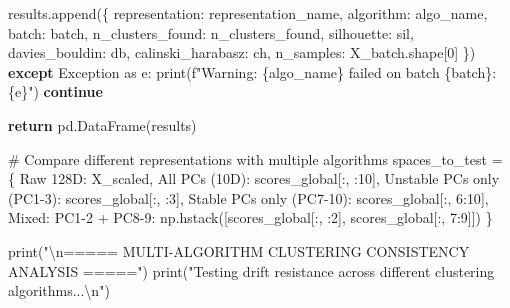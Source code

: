 \documentclass[
  letterpaper,
  DIV=11,
  numbers=noendperiod]{scrartcl}
\newenvironment{Shaded}{\begin{snugshade}}{\end{snugshade}}
\newcommand{\BuiltInTok}[1]{\textcolor[rgb]{0.00,0.23,0.31}{#1}}
\newcommand{\CharTok}[1]{\textcolor[rgb]{0.13,0.47,0.30}{#1}}
\newcommand{\CommentTok}[1]{\textcolor[rgb]{0.37,0.37,0.37}{#1}}
\newcommand{\ControlFlowTok}[1]{\textcolor[rgb]{0.00,0.23,0.31}{\textbf{#1}}}
\newcommand{\DecValTok}[1]{\textcolor[rgb]{0.68,0.00,0.00}{#1}}
\newcommand{\ImportTok}[1]{\textcolor[rgb]{0.00,0.46,0.62}{#1}}
\newcommand{\NormalTok}[1]{\textcolor[rgb]{0.00,0.23,0.31}{#1}}
\newcommand{\OperatorTok}[1]{\textcolor[rgb]{0.37,0.37,0.37}{#1}}
\newcommand{\PreprocessorTok}[1]{\textcolor[rgb]{0.68,0.00,0.00}{#1}}
\newcommand{\SpecialCharTok}[1]{\textcolor[rgb]{0.37,0.37,0.37}{#1}}
\newcommand{\SpecialStringTok}[1]{\textcolor[rgb]{0.13,0.47,0.30}{#1}}
\newcommand{\StringTok}[1]{\textcolor[rgb]{0.13,0.47,0.30}{#1}}
\renewenvironment{Shaded}{%
  \begin{tcolorbox}[%
    enhanced,%
    colback=codebg,%
    colframe=codebg,%
    borderline west={3pt}{0pt}{sectionblue},%
    fontupper=\small\ttfamily,%
    boxrule=0pt,%
    arc=0pt,%
    boxsep=5pt,%
    left=2mm,%
    right=2mm,%
    top=2mm,%
    bottom=2mm%
  ]%
}{%
  \end{tcolorbox}%
}
\begin{document}
\begin{Shaded}
\begin{Highlighting}[]
\NormalTok{                    results.append(\{}
                        \StringTok{\textquotesingle{}representation\textquotesingle{}}\NormalTok{: representation\_name,}
                        \StringTok{\textquotesingle{}algorithm\textquotesingle{}}\NormalTok{: algo\_name,}
                        \StringTok{\textquotesingle{}batch\textquotesingle{}}\NormalTok{: batch,}
                        \StringTok{\textquotesingle{}n\_clusters\_found\textquotesingle{}}\NormalTok{: n\_clusters\_found,}
                        \StringTok{\textquotesingle{}silhouette\textquotesingle{}}\NormalTok{: sil,}
                        \StringTok{\textquotesingle{}davies\_bouldin\textquotesingle{}}\NormalTok{: db,}
                        \StringTok{\textquotesingle{}calinski\_harabasz\textquotesingle{}}\NormalTok{: ch,}
                        \StringTok{\textquotesingle{}n\_samples\textquotesingle{}}\NormalTok{: X\_batch.shape[}\DecValTok{0}\NormalTok{]}
\NormalTok{                    \})}
            \ControlFlowTok{except} \PreprocessorTok{Exception} \ImportTok{as}\NormalTok{ e:}
                \BuiltInTok{print}\NormalTok{(}\SpecialStringTok{f"Warning: }\SpecialCharTok{\{}\NormalTok{algo\_name}\SpecialCharTok{\}}\SpecialStringTok{ failed on batch }\SpecialCharTok{\{}\NormalTok{batch}\SpecialCharTok{\}}\SpecialStringTok{: }\SpecialCharTok{\{}\NormalTok{e}\SpecialCharTok{\}}\SpecialStringTok{"}\NormalTok{)}
                \ControlFlowTok{continue}
    
    \ControlFlowTok{return}\NormalTok{ pd.DataFrame(results)}

\CommentTok{\# Compare different representations with multiple algorithms}
\NormalTok{spaces\_to\_test }\OperatorTok{=}\NormalTok{ \{}
    \StringTok{\textquotesingle{}Raw 128D\textquotesingle{}}\NormalTok{: X\_scaled,}
    \StringTok{\textquotesingle{}All PCs (10D)\textquotesingle{}}\NormalTok{: scores\_global[:, :}\DecValTok{10}\NormalTok{],}
    \StringTok{\textquotesingle{}Unstable PCs only (PC1{-}3)\textquotesingle{}}\NormalTok{: scores\_global[:, :}\DecValTok{3}\NormalTok{],}
    \StringTok{\textquotesingle{}Stable PCs only (PC7{-}10)\textquotesingle{}}\NormalTok{: scores\_global[:, }\DecValTok{6}\NormalTok{:}\DecValTok{10}\NormalTok{],}
    \StringTok{\textquotesingle{}Mixed: PC1{-}2 + PC8{-}9\textquotesingle{}}\NormalTok{: np.hstack([scores\_global[:, :}\DecValTok{2}\NormalTok{], scores\_global[:, }\DecValTok{7}\NormalTok{:}\DecValTok{9}\NormalTok{]])}
\NormalTok{\}}

\BuiltInTok{print}\NormalTok{(}\StringTok{"}\CharTok{\textbackslash{}n}\StringTok{===== MULTI{-}ALGORITHM CLUSTERING CONSISTENCY ANALYSIS ====="}\NormalTok{)}
\BuiltInTok{print}\NormalTok{(}\StringTok{"Testing drift resistance across different clustering algorithms...}\CharTok{\textbackslash{}n}\StringTok{"}\NormalTok{)}


\end{Highlighting}
\end{Shaded}
\end{document}
